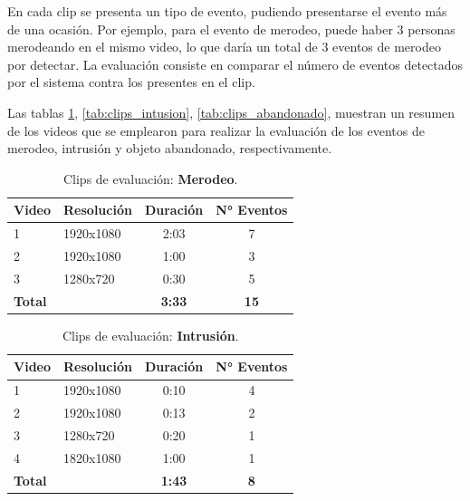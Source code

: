\documentclass[11pt,a4paper]{article}
\begin{document}
En cada clip se presenta un tipo de evento, pudiendo presentarse el evento más de una ocasión. Por ejemplo, para el evento de merodeo, puede haber 3 personas merodeando en el mismo video, lo que daría un total de 3 eventos de merodeo por detectar. La evaluación consiste en comparar el número de eventos detectados por el sistema contra los presentes en el clip.

Las tablas \ref{tab:clips_merodeo}, \ref{tab:clips_intusion}, \ref{tab:clips_abandonado}, muestran un resumen de los videos que se emplearon para realizar la evaluación de los eventos de merodeo, intrusión y objeto abandonado, respectivamente.

\begin{table}
    \centering
    \begin{tabular}{llcc}
        \toprule
        Video          & Resolución & Duración      & N° Eventos  \\
        \midrule
        1              & 1920x1080  & 2:03          & 7           \\
        2              & 1920x1080  & 1:00          & 3           \\
        3              & 1280x720   & 0:30          & 5           \\
        \textbf{Total} &            & \textbf{3:33} & \textbf{15} \\
        \bottomrule
    \end{tabular}
    \caption{Clips de evaluación: \textbf{Merodeo}.}
    \label{tab:clips_merodeo}
\end{table}

\begin{table}
    \centering
    \begin{tabular}{llcc}
        \toprule
        Video          & Resolución & Duración      & N° Eventos \\
        \midrule
        1              & 1920x1080  & 0:10          & 4          \\
        2              & 1920x1080  & 0:13          & 2          \\
        3              & 1280x720   & 0:20          & 1          \\
        4              & 1820x1080  & 1:00          & 1          \\
        \textbf{Total} &            & \textbf{1:43} & \textbf{8} \\
        \bottomrule
    \end{tabular}
    \caption{Clips de evaluación: \textbf{Intrusión}.}
    \label{tab:clips_intrusion}
\end{table}
\end{document}
